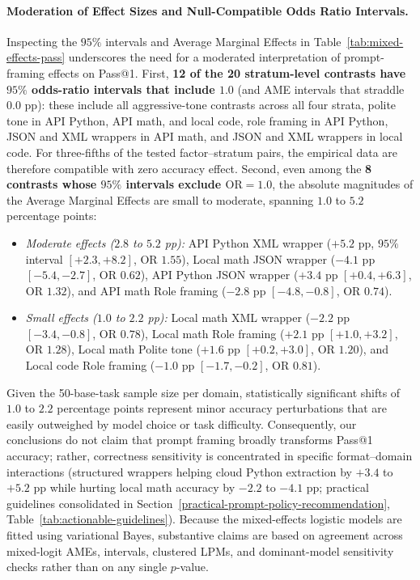 \documentclass[a4paper,fleqn]{cas-sc}
\providecommand{\tightlist}{%
  \setlength{\itemsep}{0pt}\setlength{\parskip}{0pt}}
\begin{document}
\paragraph{Moderation of Effect Sizes and Null-Compatible Odds Ratio Intervals.}
Inspecting the $95\%$ intervals and Average Marginal Effects in Table~\ref{tab:mixed-effects-pass} underscores the need for a moderated interpretation of prompt-framing effects on Pass@1. First, \textbf{12 of the 20 stratum-level contrasts have $95\%$ odds-ratio intervals that include $1.0$} (and AME intervals that straddle $0.0$ pp): these include all aggressive-tone contrasts across all four strata, polite tone in API Python, API math, and local code, role framing in API Python, JSON and XML wrappers in API math, and JSON and XML wrappers in local code. For three-fifths of the tested factor--stratum pairs, the empirical data are therefore compatible with zero accuracy effect. Second, even among the \textbf{8 contrasts whose $95\%$ intervals exclude $\text{OR} = 1.0$}, the absolute magnitudes of the Average Marginal Effects are small to moderate, spanning $1.0$ to $5.2$ percentage points:
\begin{itemize}
\tightlist
\item \emph{Moderate effects ($2.8$ to $5.2$ pp):} API Python XML wrapper ($+5.2$ pp, $95\%$ interval $[+2.3, +8.2]$, OR $1.55$), Local math JSON wrapper ($-4.1$ pp $[-5.4, -2.7]$, OR $0.62$), API Python JSON wrapper ($+3.4$ pp $[+0.4, +6.3]$, OR $1.32$), and API math Role framing ($-2.8$ pp $[-4.8, -0.8]$, OR $0.74$).
\item \emph{Small effects ($1.0$ to $2.2$ pp):} Local math XML wrapper ($-2.2$ pp $[-3.4, -0.8]$, OR $0.78$), Local math Role framing ($+2.1$ pp $[+1.0, +3.2]$, OR $1.28$), Local math Polite tone ($+1.6$ pp $[+0.2, +3.0]$, OR $1.20$), and Local code Role framing ($-1.0$ pp $[-1.7, -0.2]$, OR $0.81$).
\end{itemize}
Given the 50-base-task sample size per domain, statistically significant shifts of $1.0$ to $2.2$ percentage points represent minor accuracy perturbations that are easily outweighed by model choice or task difficulty. Consequently, our conclusions do not claim that prompt framing broadly transforms Pass@1 accuracy; rather, correctness sensitivity is concentrated in specific format--domain interactions (structured wrappers helping cloud Python extraction by $+3.4$ to $+5.2$ pp while hurting local math accuracy by $-2.2$ to $-4.1$ pp; practical guidelines consolidated in Section~\ref{practical-prompt-policy-recommendation}, Table~\ref{tab:actionable-guidelines}). Because the mixed-effects logistic models are fitted using variational Bayes, substantive claims are based on agreement across mixed-logit AMEs, intervals, clustered LPMs, and dominant-model sensitivity checks rather than on any single $p$-value.
\end{document}
